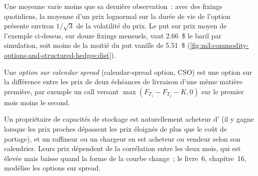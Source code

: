 Une moyenne varie moins que sa dernière observation~: avec des fixings quotidiens, la moyenne d'un prix lognormal sur
la durée de vie de l'option présente environ $1/\sqrt 3$ de la volatilité du prix. Le put sur prix moyen de l'exemple
ci-dessus, sur douze fixings mensuels, vaut 2.66~\$ le baril par simulation, soit moins de la moitié du put vanille
de 5.51~\$ (\cref{fig:m3:commodity-options-and-structured-hedges:dist}).

\begin{omfigure}

\label{fig:m3:commodity-options-and-structured-hedges:dist}
\end{omfigure}

\begin{definition}\label{def:m3:commodity-options-and-structured-hedges:cso}
Une \emph{option sur calendar spread} (calendar-spread option, CSO) est une option sur la différence entre
les prix de deux échéances de livraison d'une même matière première, par exemple un call versant $\max(F_{T_1} - F_{T_2}
- K, 0)$ sur le premier mois moins le second.
\end{definition}

Un propriétaire de capacités de stockage est naturellement acheteur d' (il y gagne lorsque les prix proches dépassent les prix éloignés
de plus que le coût de portage), et un raffineur ou un chargeur en est acheteur ou vendeur selon son
calendrier. Leurs prix dépendent de la corrélation entre les deux mois, qui est élevée mais baisse quand la forme de la
courbe change~; le livre~6, chapitre~16, modélise les options sur spread.

